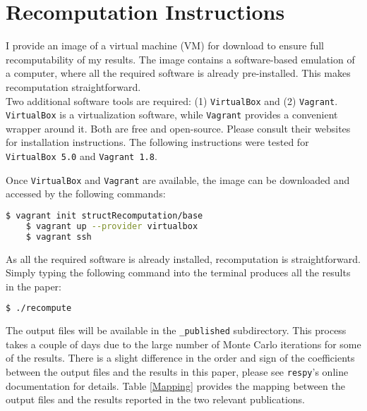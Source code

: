 \section{Recomputation Instructions}
I provide an image of a virtual machine (VM) for download to ensure full recomputability of my results. The image contains a software-based emulation of a computer, where all the required software is already pre-installed. This makes recomputation straightforward.\\\newline
%
Two additional software tools are required: (1)  \texttt{VirtualBox} and (2) \texttt{Vagrant}. \texttt{VirtualBox} is a virtualization software, while \texttt{Vagrant} provides a convenient wrapper around it. Both are free and open-source. Please consult their websites for installation instructions. The following instructions were tested for \texttt{VirtualBox 5.0} and \texttt{Vagrant 1.8}.\newline

Once \texttt{VirtualBox} and \texttt{Vagrant} are available, the image can be downloaded and accessed by the following commands:

\vspace{0.2cm}\begin{lstlisting}[language=bash]
    $ vagrant init structRecomputation/base
    $ vagrant up --provider virtualbox
    $ vagrant ssh
\end{lstlisting}\vspace{0.2cm}

As all the required software is already installed, recomputation is straightforward. Simply typing the following command into the terminal produces all the results in the paper:
\vspace{0.2cm}\begin{lstlisting}[language=bash]
    $ ./recompute
\end{lstlisting}\vspace{0.2cm}

The output files will be available in the \verb+_published+ subdirectory. This process takes a couple of days due to the large number of Monte Carlo iterations for some of the results. There is a slight difference in the order and sign of the coefficients between the output files and the results in this paper, please see  \verb+respy+'s online documentation for details. Table \ref{Mapping} provides the mapping between the output files and the results reported in the two relevant publications.


